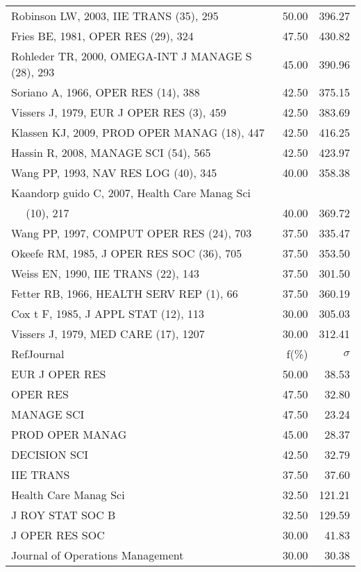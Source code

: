 \documentclass[a4paper,11pt]{report}
\begin{document}
\begin{landscape}
\begin{table}[!ht]
{\begin{tabular}{|l r r|}
Robinson LW, 2003, IIE TRANS (35), 295 & 50.00 & 396.27\\
Fries BE, 1981, OPER RES (29), 324 & 47.50 & 430.82\\
Rohleder TR, 2000, OMEGA-INT J MANAGE S (28), 293 & 45.00 & 390.96\\
Soriano A, 1966, OPER RES (14), 388 & 42.50 & 375.15\\
Vissers J, 1979, EUR J OPER RES (3), 459 & 42.50 & 383.69\\
Klassen KJ, 2009, PROD OPER MANAG (18), 447 & 42.50 & 416.25\\
Hassin R, 2008, MANAGE SCI (54), 565 & 42.50 & 423.97\\
Wang PP, 1993, NAV RES LOG (40), 345 & 40.00 & 358.38\\
Kaandorp guido C, 2007, Health Care Manag Sci &  & \\
$\quad$ (10), 217 & 40.00 & 369.72\\
Wang PP, 1997, COMPUT OPER RES (24), 703 & 37.50 & 335.47\\
Okeefe RM, 1985, J OPER RES SOC (36), 705 & 37.50 & 353.50\\
Weiss EN, 1990, IIE TRANS (22), 143 & 37.50 & 301.50\\
Fetter RB, 1966, HEALTH SERV REP (1), 66 & 37.50 & 360.19\\
Cox t F, 1985, J APPL STAT (12), 113 & 30.00 & 305.03\\
Vissers J, 1979, MED CARE (17), 1207 & 30.00 & 312.41\\
\hline
\hline
RefJournal & f(\%) & $\sigma$\\
\hline
EUR J OPER RES & 50.00 & 38.53\\
OPER RES & 47.50 & 32.80\\
MANAGE SCI & 47.50 & 23.24\\
PROD OPER MANAG & 45.00 & 28.37\\
DECISION SCI & 42.50 & 32.79\\
IIE TRANS & 37.50 & 37.60\\
Health Care Manag Sci & 32.50 & 121.21\\
J ROY STAT SOC B & 32.50 & 129.59\\
J OPER RES SOC & 30.00 & 41.83\\
Journal of Operations Management & 30.00 & 30.38\\
\hline
\end{tabular}
}
\end{table}

\clearpage


\end{landscape}
\end{document}
